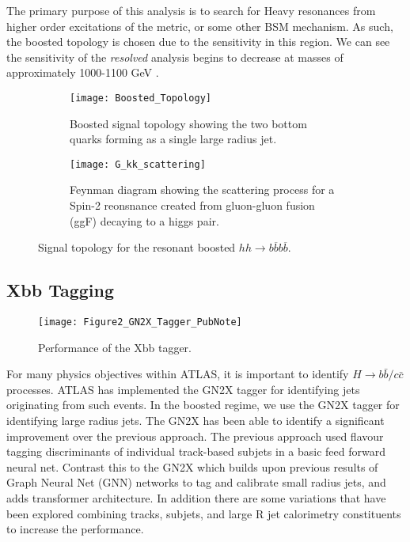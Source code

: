 \documentclass[12pt]{article}
\newcommand{\qqp}[1]{#1\overline{#1}#1\overline{#1}}
\begin{document}
The primary purpose of this analysis is to search for Heavy resonances from
higher order excitations of the metric, or some other BSM mechanism. As such,
the boosted topology is chosen due to the sensitivity in this region. We can see
the sensitivity of the \textit{resolved} analysis begins to decrease at masses
of approximately 1000-1100 GeV \cite{}. 

\begin{figure}[t]
    \centering
    \begin{subfigure}[t]{.48\textwidth}
        \centering
        \texttt{[image: Boosted\_Topology]}
        \caption{Boosted signal topology showing the two bottom quarks forming as a single large radius jet.}
        \label{subfig:boosted_topology}
    \end{subfigure}
    \hfill
    \begin{subfigure}[t]{.48\textwidth}
        \centering
        \texttt{[image: G\_kk\_scattering]}
        \caption{Feynman diagram showing the scattering process for a Spin-2
        reonsnance created from gluon-gluon fusion (ggF) decaying to a higgs pair.}
        \label{subfig:feynman}
    \end{subfigure}
    \caption{Signal topology for the resonant boosted $hh\rightarrow \qqp{b}$.}
\label{fig:signal_topologies}
\end{figure}

\subsection{Xbb Tagging}
\begin{figure}[t]
    \centering
    \texttt{[image: Figure2\_GN2X\_Tagger\_PubNote]}
    \caption{Performance of the Xbb tagger.}
    \label{fig:Xbb_tagger}
\end{figure}

For many physics objectives within ATLAS, it is important to identify
$H\rightarrow b\bar{b} / c\bar{c}$ processes. ATLAS has implemented the GN2X tagger
for identifying jets originating from such events. In the boosted regime, we use
the GN2X tagger for identifying large radius jets. The GN2X has been able to
identify a significant improvement over the previous approach. The previous
approach used flavour tagging discriminants of individual track-based subjets in
a basic feed forward neural net.  Contrast this to the GN2X which builds upon
previous results of Graph Neural Net (GNN) networks to tag and calibrate small
radius jets, and adds transformer architecture. In addition there are some
variations that have been explored combining tracks, subjets, and large R jet
calorimetry constituents to increase the performance.
\end{document}
